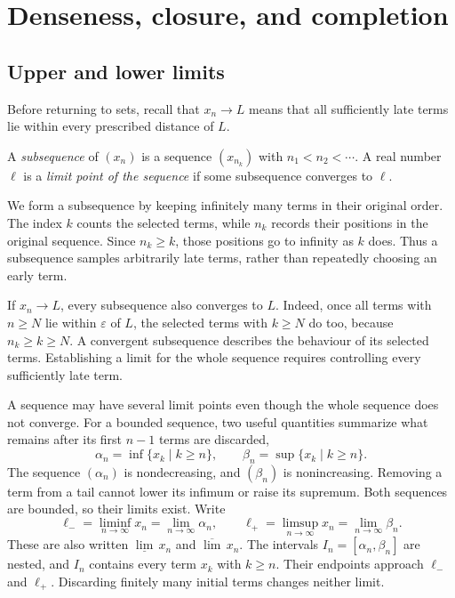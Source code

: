 \section{Denseness, closure, and completion}
\label{sec:analysis-i:denseness}

\subsection{Upper and lower limits}
Before returning to sets, recall that $x_n\to L$ means that all sufficiently
late terms lie within every prescribed distance of $L$.
\begin{definition}
  A \emph{subsequence} of $(x_n)$ is a sequence $(x_{n_k})$ with
  $n_1<n_2<\cdots$. A real number $\ell$ is a \emph{limit point of the
  sequence} if some subsequence converges to $\ell$.
\end{definition}
We form a subsequence by keeping infinitely many terms in their original
order. The index $k$ counts the selected terms, while $n_k$ records their
positions in the original sequence. Since $n_k\geq k$, those positions
go to infinity as $k$ does. Thus a subsequence samples arbitrarily late
terms, rather than repeatedly choosing an early term.

If $x_n\to L$, every subsequence also converges to $L$. Indeed, once
all terms with $n\geq N$ lie within $\varepsilon$ of $L$, the selected
terms with $k\geq N$ do too, because $n_k\geq k\geq N$.
A convergent subsequence describes the behaviour of its selected terms.
Establishing a limit for the whole sequence requires controlling every
sufficiently late term.

A sequence may have several limit points even though the whole sequence
does not converge. For a bounded sequence, two useful quantities summarize
what remains after its first $n-1$ terms are discarded,
\[
  \alpha_n=\inf\{x_k\mid k\geq n\},\qquad
  \beta_n=\sup\{x_k\mid k\geq n\}.
\]
The sequence $(\alpha_n)$ is nondecreasing, and $(\beta_n)$ is nonincreasing.
Removing a term from a tail cannot lower its infimum or raise its supremum.
Both sequences are bounded, so their limits exist. Write
\[
  \ell_-=\liminf_{n\to\infty}x_n=\lim_{n\to\infty}\alpha_n,
  \qquad
  \ell_+=\limsup_{n\to\infty}x_n=\lim_{n\to\infty}\beta_n.
\]
These are also written $\underline{\lim}\,x_n$ and $\overline{\lim}\,x_n$.
The intervals $I_n=[\alpha_n,\beta_n]$ are nested, and $I_n$ contains
every term $x_k$ with $k\geq n$. Their endpoints approach $\ell_-$ and
$\ell_+$. Discarding finitely many initial terms changes neither limit.

